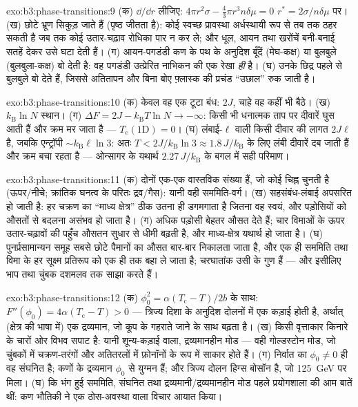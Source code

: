 \begin{solution}{exo:b3:phase-transitions:9}
(क) $\dd/\dd r$ लीजिए: $4\pi r^2\sigma - \tfrac43\pi r^3n\delta\mu = 0$
$r^* = 2\sigma/n\delta\mu$ पर। (ख) छोटे भ्रूण सिकुड़ जाते हैं (पृष्ठ
जीतता है): कोई स्वच्छ प्रावस्था अर्धस्थायी रूप से तब तक ठहर सकती है
जब तक कोई उतार-चढ़ाव रोधिका पार न कर ले; और धूल, आयन तथा खरोंचें
बनी-बनाई सतहें देकर उसे घटा देती हैं। (ग) आयन-पगडंडी कण के पथ के
अनुदिश बूँदें (मेघ-कक्ष) या बुलबुले (बुलबुला-कक्ष) बो देती है:
वह पगडंडी उत्प्रेरित नाभिकन की एक रेखा \emph{ही} है। (घ) उनके
छिद्र पहले से बुलबुले बो देते हैं, जिससे अतितापन और बिना बोए
फ़्लास्क की प्रचंड ``उछाल'' रुक जाती है।
\end{solution}

\begin{solution}{exo:b3:phase-transitions:10}
(क) केवल वह एक टूटा बंध: $2J$, चाहे वह कहीं भी बैठे। (ख)
$k_{\text{B}}\ln N$ स्थान। (ग) $\Delta F = 2J -
k_{\text{B}}T\ln N \to -\infty$: किसी भी धनात्मक ताप पर
दीवारें घुस आती हैं और क्रम मर जाता है --- $T_{\text{c}}(1\text{D}) = 0$। (घ)
लंबाई-$\ell$ वाली किसी दीवार की लागत $2J\ell$ है, जबकि एन्ट्रॉपी
$\sim k_{\text{B}}\ell\ln3$: अतः $T < 2J/k_{\text{B}}\ln3 \approx
1.8\,J/k_{\text{B}}$ के लिए लंबी दीवारें दब जाती हैं और क्रम बचा
रहता है --- ओन्सागर के यथार्थ
$2.27\,J/k_{\text{B}}$ के बगल में सही परिमाण।
\end{solution}

\begin{solution}{exo:b3:phase-transitions:11}
(क) दोनों  एक-एक वास्तविक संख्या हैं, जो कोई चिह्न चुनती
है (ऊपर/नीचे; क्रांतिक घनत्व के परितः द्रव/गैस): यानी वही
सममिति-वर्ग। (ख) सहसंबंध-लंबाई अपसरित हो जाती है: हर चक्रण का
``माध्य क्षेत्र'' ठीक उतना ही डगमगाता है जितना वह स्वयं, और
पड़ोसियों को औसतों से बदलना असंभव हो जाता है। (ग) अधिक
पड़ोसी बेहतर औसत देते हैं; चार विमाओं के ऊपर उतार-चढ़ावों की
पहुँच औसतन सुधार से धीमी बढ़ती है, और माध्य-क्षेत्र
यथार्थ हो जाता है। (घ) पुनर्प्रसामान्यन समूह सबसे छोटे पैमानों का
औसत बार-बार निकालता जाता है, और एक ही सममिति तथा विमा के हर
सूक्ष्म प्रतिरूप को एक ही  तक बहा ले जाता है; चरघातांक
उसी  के गुण हैं --- और इसीलिए भाप तथा चुंबक
दशमलव तक साझा करते हैं।
\end{solution}

\begin{solution}{exo:b3:phase-transitions:12}
(क) $\phi_0^2 = \alpha(T_{\text{c}} - T)/2b$ के साथ: $F''(\phi_0) =
4\alpha(T_{\text{c}} - T) > 0$ --- त्रिज्य दिशा के अनुदिश
दोलनों में एक कड़ाई होती है, अर्थात् (क्षेत्र की भाषा में) एक
द्रव्यमान, जो कूप के गहराते जाने के साथ बढ़ता है। (ख) किसी वृत्ताकार
किनारे के चारों ओर विभव सपाट है: यानी शून्य-कड़ाई वाला, द्रव्यमानहीन
मोड --- वही गोल्डस्टोन मोड, जो चुंबकों में चक्रण-तरंगों और
अतितरलों में फ़ोनॉनों के रूप में साकार होते हैं। (ग) निर्वात का
$\phi_0 \neq 0$ ही वह संघनित है; कणों के द्रव्यमान $\phi_0$ से
युग्मन हैं; और त्रिज्य दोलन
हिग्स बोसॉन है, जो \qty{125}{GeV} पर मिला। (घ) कि भंग हुई
सममिति, संघनित तथा द्रव्यमानी/द्रव्यमानहीन मोड पहले प्रयोगशाला की
आम बातें थीं: कण भौतिकी ने एक ठोस-अवस्था वाला विचार आयात किया।
\end{solution}

